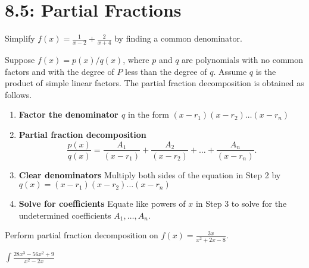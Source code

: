 \documentclass[../mathNotesPreamble]{subfiles}
\begin{document}
  \section{8.5: Partial Fractions}
  \begin{ex*}
    Simplify $\displaystyle f(x)=\frac{1}{x-2}+\frac{2}{x+4}$ by finding a common denominator.
  \end{ex*}

  \begin{thmBox*}
    Suppose $f(x)=p(x)/q(x)$, where $p$ and $q$ are polynomials with no common factors and with the degree of $P$ less than the degree of $q$. Assume $q$ is the product of simple linear factors. The partial fraction decomposition is obtained as follows.
    \begin{enumerate}[label=\textbf{Step \arabic*:}, itemindent=1.5\labelwidth]
      \item \textbf{Factor the denominator $q$} in the form $(x-r_1)(x-r_2)\dots(x-r_n)$
      \item \textbf{Partial fraction decomposition}
        \[\frac{p(x)}{q(x)}=\frac{A_1}{(x-r_1)}+\frac{A_2}{(x-r_2)}+\dots+\frac{A_n}{(x-r_n)}.\]
      \item \textbf{Clear denominators} Multiply both sides of the equation in Step 2 by $q(x)=(x-r_1)(x-r_2)\dots(x-r_n)$
      \item \textbf{Solve for coefficients} Equate like powers of $x$ in Step 3 to solve for the undetermined coefficients $A_1,\dots,A_n$.
    \end{enumerate}
  \end{thmBox*}

  \begin{ex*}
    Perform partial fraction decomposition on $\displaystyle f(x)=\frac{3x}{x^2+2x-8}$.
  \end{ex*}
  \pagebreak

  \begin{ex*}
    $\displaystyle \int \frac{28x^3-56x^2+9}{x^2-2x}$
  \end{ex*}
  \pagebreak
\end{document}
